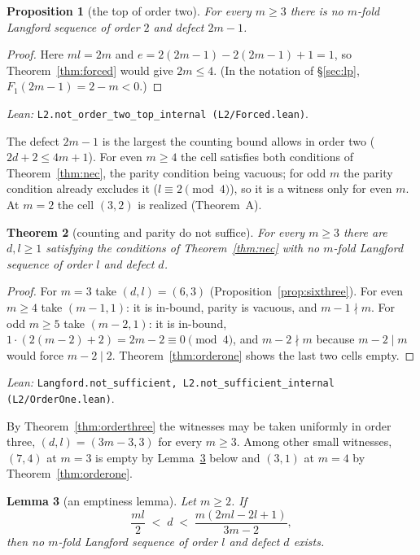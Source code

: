 \documentclass[11pt]{amsart}
\theoremstyle{plain}
\newtheorem{theorem}{Theorem}[section]
\newtheorem{lemma}[theorem]{Lemma}
\newtheorem{proposition}[theorem]{Proposition}
\theoremstyle{definition}
\theoremstyle{remark}
\newcommand{\lean}[1]{\par\smallskip
  {\small\raggedright\noindent\textit{Lean:} \texttt{#1}.\par}\smallskip}
\begin{document}
\begin{proposition}[the top of order two]\label{prop:ordertwotop}
For every $m \ge 3$ there is no $m$-fold Langford sequence of order $2$ and defect
$2m-1$.
\end{proposition}

\begin{proof}
Here $ml = 2m$ and $e = 2(2m-1) - 2(2m-1) + 1 = 1$, so Theorem~\ref{thm:forced} would
give $2m \le 4$. (In the notation of \S\ref{sec:lp}, $F_1(2m-1) = 2 - m < 0$.)
\end{proof}
\lean{L2.not\_order\_two\_top\_internal (L2/Forced.lean)}

The defect $2m-1$ is the largest the counting bound allows in order two
($2d + 2 \le 4m + 1$). For even $m \ge 4$ the cell satisfies both conditions of
Theorem~\ref{thm:nec}, the parity condition being vacuous; for odd $m$ the parity
condition already excludes it ($l \equiv 2 \pmod 4$), so it is a witness only for even
$m$. At $m = 2$ the cell $(3,2)$ is realized (Theorem~A).

\begin{theorem}[counting and parity do not suffice]\label{thm:notsuff}
For every $m \ge 3$ there are $d, l \ge 1$ satisfying the conditions of
Theorem~\ref{thm:nec} with no $m$-fold Langford sequence of order $l$ and defect $d$.
\end{theorem}

\begin{proof}
For $m = 3$ take $(d,l) = (6,3)$ (Proposition~\ref{prop:sixthree}). For even $m \ge 4$
take $(m-1,1)$: it is in-bound, parity is vacuous, and $m-1 \nmid m$. For odd
$m \ge 5$ take $(m-2,1)$: it is in-bound, $1 \cdot (2(m-2)+2) = 2m - 2 \equiv 0
\pmod 4$, and $m - 2 \nmid m$ because $m - 2 \mid m$ would force $m - 2 \mid 2$.
Theorem~\ref{thm:orderone} shows the last two cells empty.
\end{proof}
\lean{Langford.not\_sufficient, L2.not\_sufficient\_internal (L2/OrderOne.lean)}

By Theorem~\ref{thm:orderthree} the witnesses may be taken uniformly in order three,
$(d,l) = (3m-3,3)$ for every $m \ge 3$. Among other small witnesses, $(7,4)$ at $m = 3$
is empty by Lemma~\ref{lem:Z} below and $(3,1)$ at $m = 4$ by
Theorem~\ref{thm:orderone}.

\begin{lemma}[an emptiness lemma]\label{lem:Z}
Let $m \ge 2$. If
\[
  \frac{ml}{2} \;<\; d \;<\; \frac{m(2ml-2l+1)}{3m-2},
\]
then no $m$-fold Langford sequence of order $l$ and defect $d$ exists.
\end{lemma}
\end{document}
